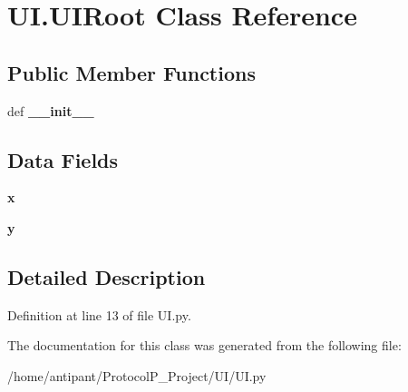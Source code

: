 \hypertarget{classUI_1_1UIRoot}{\section{U\-I.\-U\-I\-Root Class Reference}
\label{classUI_1_1UIRoot}
}
\subsection*{Public Member Functions}
\begin{DoxyCompactItemize}
\item 
\hypertarget{classUI_1_1UIRoot_a4265dd3ffbe5fe9fd1847e3ce0b000f8}{def {\bfseries \-\_\-\-\_\-init\-\_\-\-\_\-}}\label{classUI_1_1UIRoot_a4265dd3ffbe5fe9fd1847e3ce0b000f8}

\end{DoxyCompactItemize}
\subsection*{Data Fields}
\begin{DoxyCompactItemize}
\item 
\hypertarget{classUI_1_1UIRoot_a5674fee74d86fd3c98a87b820dc8f714}{{\bfseries x}}\label{classUI_1_1UIRoot_a5674fee74d86fd3c98a87b820dc8f714}

\item 
\hypertarget{classUI_1_1UIRoot_a19c3889a07c37e6330eca943e31c6e19}{{\bfseries y}}\label{classUI_1_1UIRoot_a19c3889a07c37e6330eca943e31c6e19}

\end{DoxyCompactItemize}


\subsection{Detailed Description}


Definition at line 13 of file U\-I.\-py.



The documentation for this class was generated from the following file\-:\begin{DoxyCompactItemize}
\item 
/home/antipant/\-Protocol\-P\-\_\-\-Project/\-U\-I/U\-I.\-py\end{DoxyCompactItemize}
